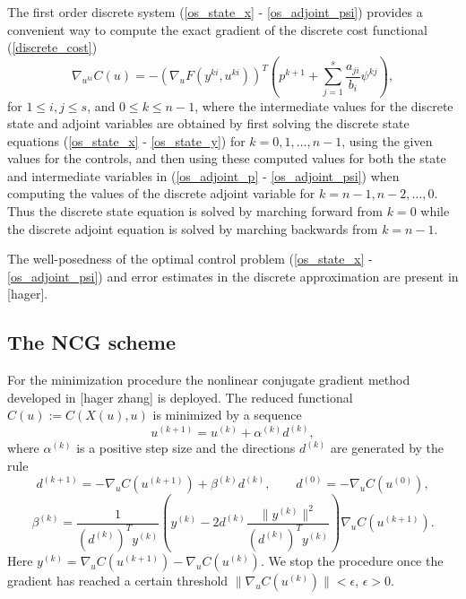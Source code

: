 \documentclass[a4paper,10pt, english]{article}
\begin{document}
The first order discrete system (\ref{os_state_x} - \ref{os_adjoint_psi}) provides a convenient way to compute the exact gradient of the discrete cost functional (\ref{discrete_cost})
\begin{equation}
\nabla_{u^{ki}} C(u) = - (\nabla_u F(y^{ki}, u^{ki}))^{T} \left( p^{k+1} + \sum_{j=1}^{s}\frac{a_{ji}}{b_i}\psi^{kj}\right), 
\label{discretegradient}
 \end{equation}  
 for $1\leq i, j\leq s$, and $0\leq k\leq n-1$, where the intermediate values for the discrete state and adjoint variables are obtained by first
 solving the discrete state equations (\ref{os_state_x} - \ref{os_state_y}) for $k=0, 1, \dots, n-1$, using the given values for the controls, and then using these computed values for both the state and intermediate variables in (\ref{os_adjoint_p} - \ref{os_adjoint_psi}) when computing the values of the discrete adjoint variable for $k=n-1, n-2, \dots, 0$. Thus the discrete state equation is solved by marching forward from 
 $ k = 0$ while the discrete adjoint equation is solved by marching backwards from $k = n-1$.
 
 The well-posedness of the optimal control problem (\ref{os_state_x} - \ref{os_adjoint_psi}) and error estimates in the discrete approximation are present in [hager].
 


 \subsection{The NCG scheme}
  For the minimization procedure the nonlinear conjugate gradient  method developed in [hager zhang] is deployed.
  The reduced functional $C(u):=C(X(u), u)$ is minimized by a sequence
  \begin{equation}
  u^{(k+1)} =   u^{(k)} + \alpha^{(k)} d^{(k)},
  \label{ncgscheme}
   \end{equation}  
  where $\alpha^{(k)}$ is a positive step size and the directions $d^{(k)}$ are generated by the rule
  \begin{equation}
  d^{(k+1)} = - \nabla_u C(u^{(k+1)}) + \beta^{(k)} d^{(k)}, \qquad d^{(0)} = -\nabla_u C(u^{(0)}),
  \label{drct}
  \end{equation}
  \begin{equation}
  \beta^{(k)} = \frac{1}{(d^{(k)})^T y^{(k)}} \left( y^{(k)} - 2d^{(k)}\frac{\|y^{(k)}\|^2}{(d^{(k)})^T y^{(k)}}\right)\nabla_u C(u^{(k+1)}).
  \label{drct}
  \end{equation}  
  Here $y^{(k)} = \nabla_u C(u^{(k+1)}) - \nabla_u C(u^{(k)})$. 
  We stop the procedure once the gradient has reached a certain threshold $\|\nabla_u C(u^{(k)})\| < \epsilon$, $\epsilon > 0$.
   
\end{document}
